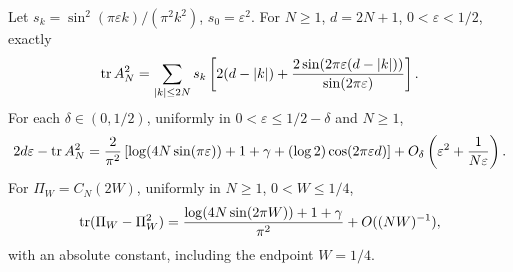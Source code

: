 \begin{theorem}\label{thm:hs-discrete}
Let $s_k=\sin^2(\pi\varepsilon k)/(\pi^2k^2)$, $s_0=\varepsilon^2$.
For $N\ge1$, $d=2N+1$, $0<\varepsilon<1/2$, exactly
\begin{equation}\label{eq:hs-finite-identity}
\operatorname{tr} A_N^2=\sum_{|k|\le2N}s_k\left[
2(d-|k|)+\frac{2\sin(2\pi\varepsilon(d-|k|))}
{\sin(2\pi\varepsilon)}\right].
\end{equation}
For each $\delta\in(0,1/2)$, uniformly in
$0<\varepsilon\le1/2-\delta$ and $N\ge1$,
\begin{equation}\label{eq:hs-discrete}
2d\varepsilon-\operatorname{tr} A_N^2=
\frac2{\pi^2}\left[\log(4N\sin(\pi\varepsilon))+1+\gamma
 +(\log2)\cos(2\pi\varepsilon d)\right]
 +O_\delta\left(\varepsilon^2+\frac1{N\varepsilon}\right).
\end{equation}
For $\Pi_W=C_N(2W)$, uniformly in $N\ge1$, $0<W\le1/4$,
\begin{equation}\label{eq:dpss-discrete}
\operatorname{tr}(\Pi_W-\Pi_W^2)=
\frac{\log(4N\sin(2\pi W))+1+\gamma}{\pi^2}
 +O((NW)^{-1}),
\end{equation}
with an absolute constant, including the endpoint $W=1/4$.
\end{theorem}
